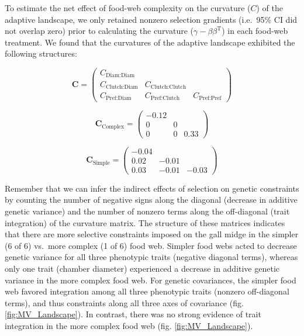 \documentclass[11pt,]{article}
\begin{document}
To estimate the net effect of food-web complexity on the curvature
(\(C\)) of the adaptive landscape, we only retained nonzero selection
gradients (i.e.~95\% CI did not overlap zero) prior to calculating the
curvature (\(\gamma - \beta \beta^\text{T}\)) in each food-web
treatment. We found that the curvatures of the adaptive landscape
exhibited the following structures:

\[\textbf{C} = \begin{pmatrix} C_{\text{Diam:Diam}}&& \\ C_{\text{Clutch:Diam}} & C_{\text{Clutch:Clutch}} & \\ C_{\text{Pref:Diam}} & C_{\text{Pref:Clutch}} & C_{\text{Pref:Pref}} \end{pmatrix}\]

\[\textbf{C}_{\text{Complex}} = \begin{pmatrix} 
-0.12 &  &  \\  
0 & 0 &  \\  
0 & 0 & 0.33 \end{pmatrix}\]

\[\textbf{C}_{\text{Simple}} = \begin{pmatrix} 
-0.04 &  &  \\  
0.02 & -0.01 &  \\  
0.03 & -0.01 & -0.03 \end{pmatrix}\]

Remember that we can infer the indirect effects of selection on genetic
constraints by counting the number of negative signs along the diagonal
(decrease in additive genetic variance) and the number of nonzero terms
along the off-diagonal (trait integration) of the curvature matrix. The
structure of these matrices indicates that there are more selective
constraints imposed on the gall midge in the simpler (6 of 6) vs.~more
complex (1 of 6) food web. Simpler food webs acted to decrease genetic
variance for all three phenotypic traits (negative diagonal terms),
whereas only one trait (chamber diameter) experienced a decrease in
additive genetic variance in the more complex food web. For genetic
covariances, the simpler food web favored integration among all three
phenotypic traits (nonzero off-diagonal terms), and thus constraints
along all three axes of covariance (fig. \ref{fig:MV_Landscape}). In
contrast, there was no strong evidence of trait integration in the more
complex food web (fig. \ref{fig:MV_Landscape}).
\end{document}
